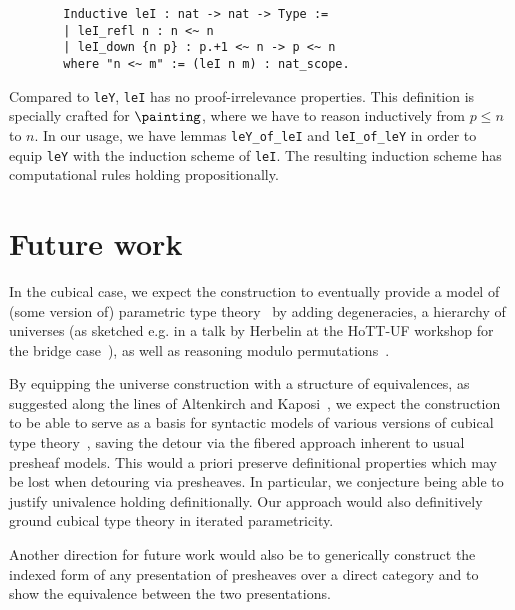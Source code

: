 \documentclass{msc}
\begin{document}
\begin{figure}[H]
  \begin{verbatim}
  Inductive leI : nat -> nat -> Type :=
  | leI_refl n : n <~ n
  | leI_down {n p} : p.+1 <~ n -> p <~ n
  where "n <~ m" := (leI n m) : nat_scope.
  \end{verbatim}
\end{figure}

Compared to \texttt{leY}, \texttt{leI} has no proof-irrelevance properties. This definition is specially crafted for $\painting$, where we have to reason inductively from $p \leq n$ to $n$. In our usage, we have lemmas \texttt{leY\_of\_leI} and \texttt{leI\_of\_leY} in order to equip \texttt{leY} with the induction scheme of \texttt{leI}. The resulting induction scheme has computational rules holding propositionally.

\section{Future work}
In the cubical case, we expect the construction to eventually provide a model of (some version of) parametric type theory~\cite{nuyts17,cavallo19} by adding degeneracies, a hierarchy of universes (as sketched e.g. in a talk by Herbelin at the HoTT-UF workshop for the bridge case~\cite{herbelin-hott-uf}), as well as reasoning modulo permutations~\cite{grandis03}.

By equipping the universe construction with a structure of equivalences, as suggested along the lines of Altenkirch and Kaposi~\cite{altenkirch15}, we expect the construction to be able to serve as a basis for syntactic models of various versions of cubical type theory~\cite{bezem13,cohen16,angiuli21}, saving the detour via the fibered approach inherent to usual presheaf models. This would a priori preserve definitional properties which may be lost when detouring via presheaves. In particular, we conjecture being able to justify univalence holding definitionally. Our approach would also definitively ground cubical type theory in iterated parametricity.

Another direction for future work would also be to generically construct the indexed form of any presentation of presheaves over a direct category and to show the equivalence between the two presentations.


\end{document}
